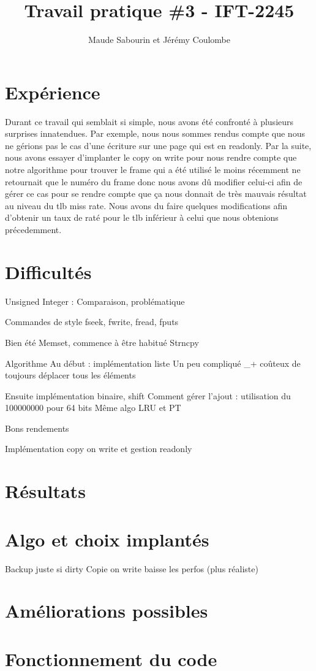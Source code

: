 \documentclass{article}
\title{Travail pratique \#3 - IFT-2245}
\author{Maude Sabourin et Jérémy Coulombe}
\begin{document}
\maketitle

\section{Expérience}
Durant ce travail qui semblait si simple, nous avons été confronté à plusieurs surprises innatendues. Par exemple, nous nous sommes rendus compte que nous ne gérions pas le cas d'une écriture sur une page qui est en readonly. Par la suite, nous avons essayer d'implanter le copy on write pour nous rendre compte que notre algorithme pour trouver le frame qui a été utilisé le moins récemment ne retournait que le numéro du frame donc nous avons dû modifier celui-ci afin de gérer ce cas pour se rendre compte que ça nous donnait de très mauvais résultat au niveau du tlb miss rate. Nous avons du faire quelques modifications afin d'obtenir un taux de raté pour le tlb inférieur à celui que nous obtenions précedemment.

\section {Difficultés}
Unsigned Integer : Comparaison, problématique

Commandes de style fseek, fwrite, fread, fputs

Bien été
Memset, commence à être habitué
Strncpy

Algorithme
Au début : implémentation liste 
Un peu compliqué _+ coûteux de toujours déplacer tous les éléments

Ensuite implémentation binaire, shift
Comment gérer l’ajout : utilisation du 100000000 pour 64 bits 
Même algo LRU et PT

Bons rendements

Implémentation copy on write et gestion readonly

\section{Résultats}


\section{Algo et choix implantés}
Backup juste si dirty
Copie on write baisse les perfos (plus réaliste)
\section{Améliorations possibles}


\section{Fonctionnement du code}
\end{document}
